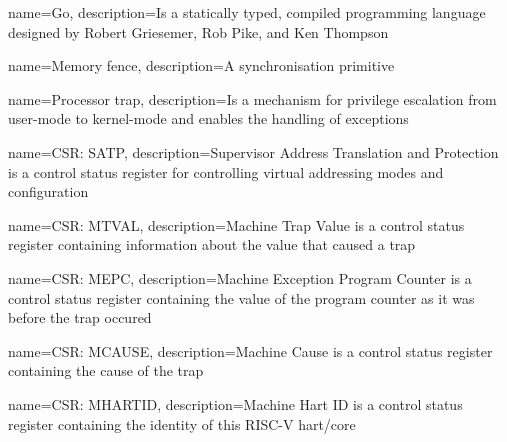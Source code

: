 
 {
    name=Go,
    description={Is a statically typed, compiled programming language designed by Robert Griesemer, Rob Pike, and Ken Thompson}
}

 {
    name=Memory fence,
    description={A synchronisation primitive}
}

 {
    name=Processor trap,
    description={Is a mechanism for privilege escalation from user-mode to kernel-mode and enables the handling of exceptions}
}

 {
    name=CSR: SATP,
    description={Supervisor Address Translation and Protection is a control status register for controlling virtual addressing modes and configuration}
}

 {
    name=CSR: MTVAL,
    description={Machine Trap Value is a control status register containing information about the value that caused a trap}
}

 {
    name=CSR: MEPC,
    description={Machine Exception Program Counter is a control status register containing the value of the program counter as it was before the trap occured}
}

 {
    name=CSR: MCAUSE,
    description={Machine Cause is a control status register containing the cause of the trap}
}

 {
    name=CSR: MHARTID,
    description={Machine Hart ID is a control status register containing the identity of this RISC-V hart/core}
}
